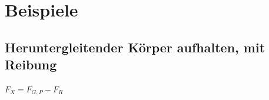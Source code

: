 \documentclass[11pt,twoside,a4paper]{article}
\begin{document}
	\section{Beispiele}
	
	\subsection{Heruntergleitender Körper aufhalten, mit Reibung}
	
	\(F_X = F_{G,P} - F_R \)
	
	
	
	
	
	
	
	
	
	
\end{document}
